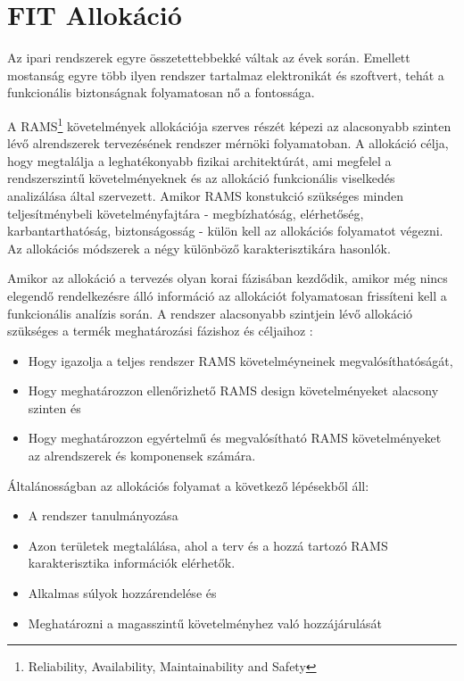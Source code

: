 \section{FIT Allokáció} \label{sec:fit_allocation}
Az ipari rendszerek egyre összetettebbekké váltak az évek során. 
Emellett mostanság egyre több ilyen rendszer tartalmaz elektronikát és szoftvert, 
tehát a funkcionális biztonságnak folyamatosan nő a fontossága.\cite{Schabe}

A RAMS\footnote{Reliability, Availability, Maintainability and Safety} követelmények allokációja szerves részét képezi az alacsonyabb szinten lévő alrendszerek tervezésének rendszer mérnöki folyamatoban.
A allokáció célja, hogy megtalálja a leghatékonyabb fizikai architektúrát, ami megfelel a rendszerszintű követelményeknek és az allokáció funkcionális viselkedés analizálása által szervezett.
Amikor RAMS konstukció szükséges minden teljesítménybeli követelményfajtára - megbízhatóság, elérhetőség, karbantarthatóság, biztonságosság - külön kell az allokációs folyamatot végezni.
Az allokációs módszerek a négy különböző karakterisztikára hasonlók. \cite{en60300-3-1}

Amikor az allokáció a tervezés olyan korai fázisában kezdődik, amikor még nincs elegendő rendelkezésre álló információ az allokációt folyamatosan frissíteni kell a funkcionális analízis során.
A rendszer alacsonyabb szintjein lévő allokáció szükséges a termék meghatározási fázishoz és céljaihoz \cite{en60300-1}:
\begin{itemize}
	\item Hogy igazolja a teljes rendszer RAMS követelméyneinek megvalósíthatóságát,
	\item Hogy meghatározzon ellenőrizhető RAMS design követelményeket alacsony szinten és
	\item Hogy meghatározzon egyértelmű és megvalósítható RAMS követelményeket az alrendszerek és komponensek számára.
\end{itemize}
Általánosságban az allokációs folyamat a következő lépésekből áll:
\begin{itemize}
	\item A rendszer tanulmányozása
	\item Azon területek megtalálása, ahol a terv és a hozzá tartozó RAMS karakterisztika információk elérhetők.
	\item Alkalmas súlyok hozzárendelése és
	\item Meghatározni a magasszintű követelményhez való hozzájárulását
\end{itemize}


